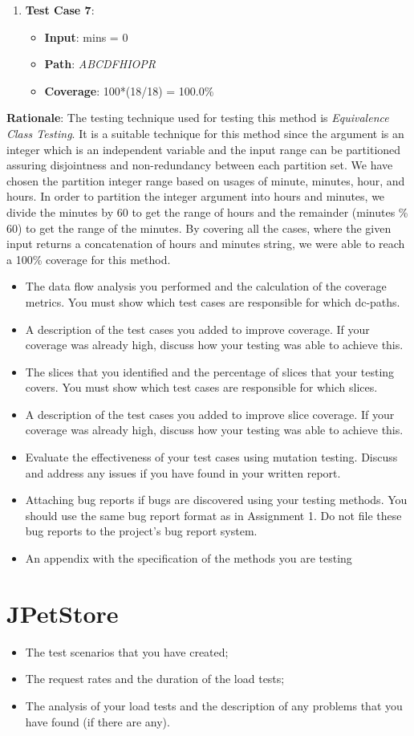 \documentclass[fontsize=12pt,paper=letter,twoside]{scrartcl}
\begin{document}
\begin{enumerate}
\item \textbf{Test Case 7}:
\begin{itemize}
\item \textbf{Input}: mins = 0
\item \textbf{Path}: \emph{ABCDFHIOPR}
\item \textbf{Coverage}: 100*(18/18) = 100.0\%
\end{itemize}

\end{enumerate}

\noindent \textbf{Rationale}: The testing technique used for testing this method is \emph{Equivalence Class Testing}. It is a suitable technique for this method since the argument is an integer which is an independent variable and the input range can be partitioned assuring disjointness and non-redundancy between each partition set. We have chosen the partition integer range based on usages of minute, minutes, hour, and hours. In order to partition the integer argument into hours and minutes, we divide the minutes by 60 to get the range of hours and the remainder (minutes \% 60) to get the range of the minutes. By covering all the cases, where the given input returns a concatenation of hours and minutes string, we were able to reach a 100\% coverage for this method.

\newpage
\begin{itemize}
\item The data flow analysis you performed and the calculation of the coverage metrics. You must
show which test cases are responsible for which dc-paths.
\item A description of the test cases you added to improve coverage. If your coverage was already high,
discuss how your testing was able to achieve this.
\item The slices that you identified and the percentage of slices that your testing covers. You must
show which test cases are responsible for which slices.
\item A description of the test cases you added to improve slice coverage. If your coverage was
already high, discuss how your testing was able to achieve this.
\item Evaluate the effectiveness of your test cases using mutation testing. Discuss and address any
issues if you have found in your written report.
\item Attaching bug reports if bugs are discovered using your testing methods. You should use the
same bug report format as in Assignment 1. Do not file these bug reports to the project’s bug
report system.
\item An appendix with the specification of the methods you are testing
\end{itemize}

\section{JPetStore}

\begin{itemize}
\item The test scenarios that you have created;
\item The request rates and the duration of the load tests;
\item The analysis of your load tests and the description of any problems that you have found (if there
are any).
\end{itemize}
\end{document}
